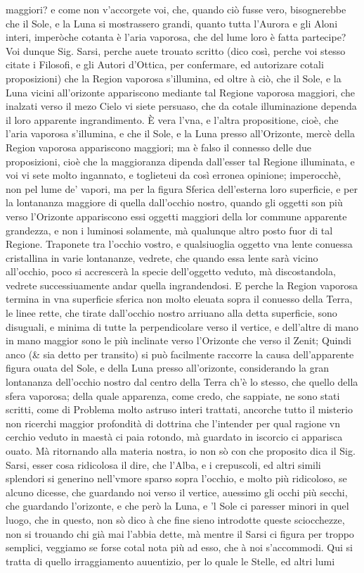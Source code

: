 \documentclass[11pt,twoside,openany]{book}
\begin{document}
maggiori? e come non v'accorgete voi, che, quando ciò fusse vero, bisognerebbe che il Sole, e la Luna si mostrassero grandi, quanto tutta l'Aurora e gli Aloni interi, imperòche cotanta è l'aria vaporosa, che del lume loro è fatta partecipe? Voi dunque Sig. Sarsi, perche auete trouato scritto (dico così, perche voi stesso citate i Filosofi, e gli Autori d'Ottica, per confermare, ed autorizare cotali proposizioni) che la Region vaporosa s'illumina, ed oltre à ciò, che il Sole, e la Luna vicini all'orizonte appariscono mediante tal Regione vaporosa maggiori, che inalzati verso il mezo Cielo vi siete persuaso, che da cotale illuminazione dependa il loro apparente ingrandimento. È vera l'vna, e l'altra propositione, cioè, che l'aria vaporosa s'illumina, e che il Sole, e la Luna presso all'Orizonte, mercè della Region vaporosa appariscono maggiori; ma è falso il connesso delle due proposizioni, cioè che la maggioranza dipenda dall'esser tal Regione illuminata, e voi vi sete molto ingannato, e toglieteui da così erronea opinione; imperocchè, non pel lume de' vapori, ma per la figura Sferica dell'esterna loro superficie, e per la lontananza maggiore di quella dall'occhio nostro, quando gli oggetti son più verso l'Orizonte appariscono essi oggetti maggiori della lor commune apparente grandezza, e non i luminosi solamente, mà qualunque altro posto fuor di tal Regione. Traponete tra l'occhio vostro, e qualsiuoglia oggetto vna lente conuessa cristallina in varie lontananze, vedrete, che quando essa lente sarà vicino all'occhio, poco si accrescerà la specie dell'oggetto veduto, mà discostandola, vedrete successiuamente andar quella ingrandendosi. E perche la Region vaporosa termina in vna superficie sferica non molto eleuata sopra il conuesso della Terra, le linee rette, che tirate dall'occhio nostro arriuano alla detta superficie, sono disuguali, e minima di tutte la perpendicolare verso il vertice, e dell'altre di mano in mano maggior sono le più inclinate verso l'Orizonte che verso il Zenit; Quindi anco (\& sia detto per transito) si può facilmente raccorre la causa dell'apparente figura ouata del Sole, e della Luna presso all'orizonte, considerando la gran lontananza dell'occhio nostro dal centro della Terra ch'è lo stesso, che quello della sfera vaporosa; della quale apparenza, come credo, che sappiate, ne sono stati scritti, come di Problema molto astruso interi trattati, ancorche tutto il misterio non ricerchi maggior profondità di dottrina che l'intender per qual ragione vn cerchio veduto in maestà ci paia rotondo, mà guardato in iscorcio ci apparisca ouato. Mà ritornando alla materia nostra, io non sò con che proposito dica il Sig. Sarsi, esser cosa ridicolosa il dire, che l'Alba, e i crepuscoli, ed altri simili splendori si generino nell'vmore sparso sopra l'occhio, e molto più ridicoloso, se alcuno dicesse, che guardando noi verso il vertice, auessimo gli occhi più secchi, che guardando l'orizonte, e che però la Luna, e 'l Sole ci paresser minori in quel luogo, che in questo, non sò dico à che fine sieno introdotte queste sciocchezze, non si trouando chi già mai l'abbia dette, mà mentre il Sarsi ci figura per troppo semplici, veggiamo se forse cotal nota più ad esso, che à noi s'accommodi. Qui si tratta di quello irraggiamento auuentizio, per lo quale le Stelle, ed altri lumi 
\end{document}
